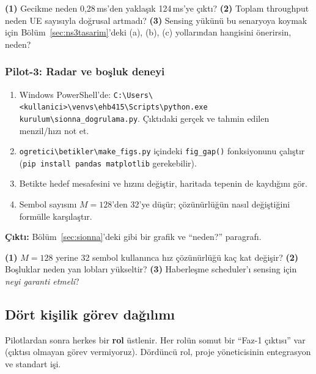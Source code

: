 \begin{ipucu}
\textbf{(1)} Gecikme neden 0,28\,ms'den yaklaşık 124\,ms'ye çıktı? \quad
\textbf{(2)} Toplam throughput neden UE sayısıyla doğrusal artmadı? \quad
\textbf{(3)} Sensing yükünü bu senaryoya koymak için Bölüm~\ref{sec:ns3tasarim}'deki (a), (b), (c) yollarından hangisini önerirsin, neden?
\end{ipucu}

\subsubsection{Pilot-3: Radar ve boşluk deneyi}

\begin{pilot}
\begin{enumerate}[leftmargin=1.5em]
\item Windows PowerShell'de: \texttt{C:\textbackslash Users\textbackslash <kullanici>\textbackslash venvs\textbackslash ehb415\textbackslash Scripts\textbackslash python.exe kurulum\textbackslash sionna\_dogrulama.py}. Çıktıdaki gerçek ve tahmin edilen menzil/hızı not et.
\item \texttt{ogretici\textbackslash betikler\textbackslash make\_figs.py} içindeki \texttt{fig\_gap()} fonksiyonunu çalıştır (\texttt{pip install pandas matplotlib} gerekebilir).
\item Betikte hedef mesafesini ve hızını değiştir, haritada tepenin de kaydığını gör.
\item Sembol sayısını $M=128$'den 32'ye düşür; çözünürlüğün nasıl değiştiğini formülle karşılaştır.
\end{enumerate}
\textbf{Çıktı:} Bölüm~\ref{sec:sionna}'deki gibi bir grafik ve ``neden?'' paragrafı.
\end{pilot}

\begin{ipucu}
\textbf{(1)} $M=128$ yerine 32 sembol kullanınca hız çözünürlüğü kaç kat değişir? \quad
\textbf{(2)} Boşluklar neden yan lobları yükseltir? \quad
\textbf{(3)} Haberleşme scheduler'ı sensing için \emph{neyi garanti etmeli}?
\end{ipucu}

\subsection{Dört kişilik görev dağılımı}\label{sec:roller}

Pilotlardan sonra herkes bir \textbf{rol} üstlenir. Her rolün somut bir ``Faz-1 çıktısı'' var (çıktısı olmayan görev vermiyoruz). Dördüncü rol, proje yöneticisinin entegrasyon ve standart işi.

